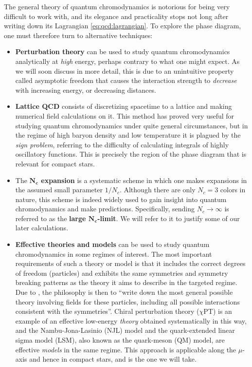 The general theory of quantum chromodynamics is notorious for being very difficult to work with,
and its elegance and practicality stops not long after writing down its Lagrangian \eqref{eq:qcd:lagrangian}.
To explore the phase diagram, one must therefore turn to alternative techniques:
\begin{itemize}
\item \textbf{Perturbation theory} can be used to study quantum chromodynamics analytically at \emph{high} energy, perhaps contrary to what one might expect.
      As we will soon discuss in more detail, this is due to an unintuitive property called asymptotic freedom that causes the interaction strength to \emph{decrease} with increasing energy, or decreasing distances.
\item \textbf{Lattice QCD} consists of discretizing spacetime to a lattice and making numerical field calculations on it.
      This method has proved very useful for studying quantum chromodynamics under quite general circumstances,
      but in the regime of high baryon density and low temperature it is plagued by the \emph{sign problem},
      referring to the difficulty of calculating integrals of highly oscillatory functions.
      This is precisely the region of the phase diagram that is relevant for compact stars.
\item The \textbf{$\bm{N_c}$ expansion} is a systematic scheme in which one makes expansions in the assumed small parameter $1/N_c$.
      Although there are only $N_c = 3$ colors in nature, this scheme is indeed widely used to gain insight into quantum chromodynamics and make predictions. \cite{ref:large_Nc_review}
      Specifically, sending $N_c \rightarrow \infty$ is referred to as the \textbf{large $\bm{N_c}$-limit}.
      We will refer to it to justify some of our later calculations.
\item \textbf{Effective theories and models} can be used to study quantum chromodynamics in some regimes of interest.
      The most important requirements of such a theory or model is that it includes the correct degrees of freedom (particles) and exhibits the same symmetries and symmetry breaking patterns as the theory it aims to describe in the targeted regime.
      Due to \cite{ref:weinberg_eft}, the philosophy is then to ``write down the most general possible theory involving fields for these particles, including all possible interactions consistent with the symmetries''.
      Chiral perturbation theory ($\chi$PT) is an example of an effective low-energy \emph{theory} obtained systematically in this way,
      and the Nambu-Jona-Lasinio (NJL) model and the quark-extended linear sigma model (LSM), also known as the quark-meson (QM) model, are effective \emph{models} in the same regime.
      This approach is applicable along the $\mu$-axis and hence in compact stars, and is the one we will take.
\end{itemize}

